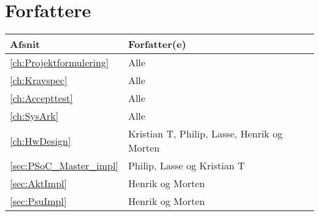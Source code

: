 \chapter*{Forfattere} %
\begin{table}[h]
\centering
\begin{tabularx}{/6}{|l|X|}
	\hline
	Afsnit & Forfatter(e) \\ \hline
	\ref{ch:Projektformulering} \nameref{ch:Projektformulering} & Alle \\ \hline
	\ref{ch:Kravspec} \nameref{ch:Kravspec} & Alle \\ \hline
	\ref{ch:Accepttest} \nameref{ch:Accepttest} & Alle \\ \hline
	\ref{ch:SysArk} \nameref{ch:SysArk} & Alle \\ \hline
	\ref{ch:HwDesign} \nameref{ch:HwDesign} & Kristian T, Philip, Lasse, Henrik og Morten \\ \hline
 		\ref{sec:PSoC_Master_impl} \nameref{sec:PSoC_Master_impl}  & Philip, Lasse og Kristian T \\ \hline
		\ref{sec:AktImpl} \nameref{sec:AktImpl} & Henrik og Morten \\ \hline
		\ref{sec:PsuImpl} \nameref{sec:PsuImpl} & Henrik og Morten \\ \hline
\end{tabularx}
\end{table}

\clearpage

\setcounter{page}{1}
\mainmatter









